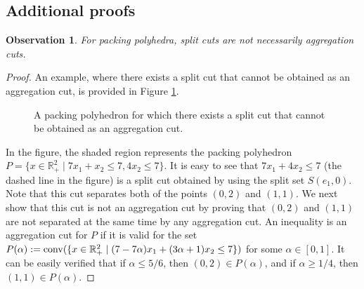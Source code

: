 \documentclass[11pt]{article}
\newcommand{\R}{\mathbb{R}}
\DeclareMathOperator{\conv}{conv}
\newtheorem{observation}{Observation}
\def\conv{\mathop{\rm conv}}
\begin{document}
\begin{appendix}
\section{Additional proofs}
\label{sec:appendix}
\begin{observation} 
\label{obs:PackingSplitAgg}
For packing polyhedra, split cuts are not necessarily aggregation cuts.
\end{observation}
\begin{proof}
An example, where there exists a split cut that cannot be obtained as an aggregation cut, is provided in Figure \ref{fig:PackingSplitAgg}. 
\begin{figure}[h]
\centering
{}
\caption{A packing polyhedron for which there exists a split cut that cannot be obtained as an aggregation cut.}
\label{fig:PackingSplitAgg}
\end{figure}
In the figure, the shaded region represents the packing polyhedron $P = \{ x \in \R_+^2   \mid 7 x_1 + x_2 \leq 7, 4 x_2 \leq 7\}$. It is easy to see that $7 x_1+4 x_2 \leq 7$ (the dashed line in the figure) is a split cut obtained by using the split set $S(e_1,0)$. Note that this cut separates both of the points $(0,2)$ and $(1,1)$. We next show that this cut is not an aggregation cut by proving that $(0,2)$ and $(1,1)$ are not separated at the same time by any aggregation cut. An inequality is an aggregation cut for $P$ if it is valid for the set $P(\alpha) := \conv ( \{ x\in \R_+^2 \mid (7-7\alpha) x_1 + (3 \alpha +1) x_2 \leq 7 \})$ for some $\alpha \in [0,1]$. It can be easily verified that if $\alpha \leq 5/6$, then $(0,2) \in P(\alpha)$, and if $\alpha \geq 1/4$, then $(1,1) \in P(\alpha)$.
\end{proof}

\end{appendix}
\end{document}
